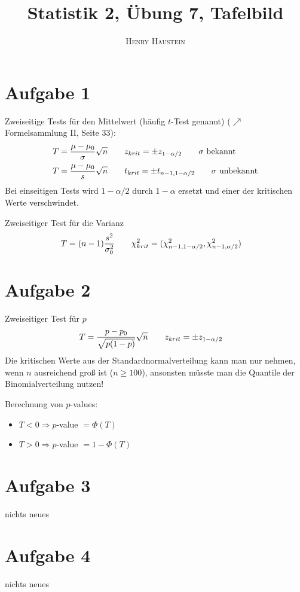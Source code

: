 \documentclass{article}
\title{\textbf{Statistik 2, Übung 7, Tafelbild}}
\author{\textsc{Henry Haustein}}
\date{}
\begin{document}
	\maketitle
	
	\section*{Aufgabe 1}
	Zweiseitige Tests für den Mittelwert (häufig $t$-Test genannt) ($\nearrow$ Formelsammlung II, Seite 33):
	\begin{align}
		T &= \frac{\mu - \mu_0}{\sigma}\sqrt{n} \qquad z_{krit} = \pm z_{1-\alpha/2} \qquad\sigma\text{ bekannt} \notag \\
		T &= \frac{\mu - \mu_0}{s}\sqrt{n} \qquad t_{krit} = \pm t_{n-1,1-\alpha/2} \qquad\sigma\text{ unbekannt} \notag
	\end{align}
	Bei einseitigen Tests wird $1-\alpha/2$ durch $1-\alpha$ ersetzt und einer der kritischen Werte verschwindet.
	
	Zweiseitiger Test für die Varianz
	\begin{align}
		T &= (n-1)\frac{s^2}{\sigma_0^2} \qquad\chi^2_{krit} = (\chi^2_{n-1,1-\alpha/2},\chi^2_{n-1,\alpha/2}) \notag
	\end{align}

	\section*{Aufgabe 2}
	Zweiseitiger Test für $p$
	\begin{align}
		T &= \frac{p-p_0}{\sqrt{p(1-p)}}\sqrt{n} \qquad z_{krit} = \pm z_{1-\alpha/2} \notag
	\end{align}
	Die kritischen Werte aus der Standardnormalverteilung kann man nur nehmen, wenn $n$ ausreichend groß ist ($n\ge 100$), ansonsten müsste man die Quantile der Binomialverteilung nutzen!
	
	Berechnung von $p$-values:
	\begin{itemize}
		\item $T<0\Rightarrow p$-value $= \Phi(T)$
		\item $T>0\Rightarrow p$-value $= 1-\Phi(T)$
	\end{itemize}

	\section*{Aufgabe 3}
	nichts neues
	
	\section*{Aufgabe 4}
	nichts neues
	
\end{document}
